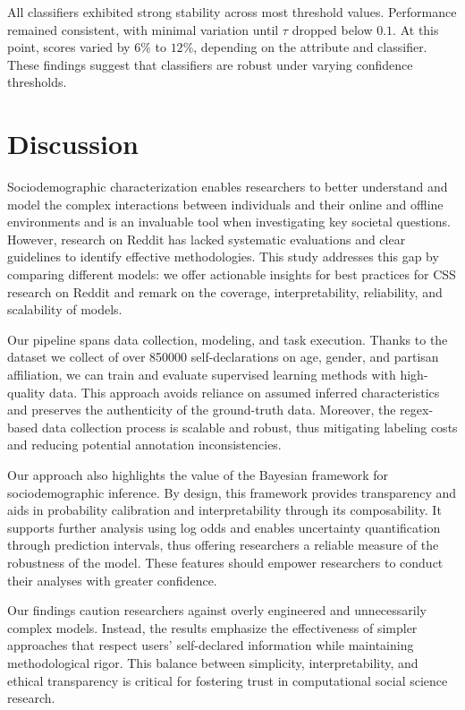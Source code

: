 All classifiers exhibited strong stability across most threshold values.
Performance remained consistent, with minimal variation until $\tau$ dropped below $0.1$.
At this point, scores varied by $6\%$ to $12\%$, depending on the attribute and classifier.
These findings suggest that classifiers are robust under varying confidence thresholds.



\section{Discussion}

Sociodemographic characterization enables researchers to better understand and model the complex interactions between individuals and their online and offline environments and is an invaluable tool when investigating key societal questions.
However, research on Reddit has lacked systematic evaluations and clear guidelines to identify effective methodologies.
This study addresses this gap by comparing different models:
we offer actionable insights for best practices for CSS research on Reddit and remark on the coverage, interpretability, reliability, and scalability of models.

Our pipeline
spans data collection, modeling, and task execution. %
Thanks to the dataset we collect of over \num{850000} self-declarations on age, gender, and partisan affiliation, we can train and evaluate supervised learning methods with high-quality data.
This approach avoids reliance on assumed inferred characteristics and preserves the authenticity of the ground-truth data.
Moreover, the regex-based data collection process is scalable and robust, thus mitigating labeling costs and reducing potential annotation inconsistencies.


Our approach also highlights the value of the Bayesian framework for sociodemographic inference.
By design, this framework provides transparency and aids in probability calibration and interpretability through its composability.
It supports further analysis using log odds and enables uncertainty quantification through prediction intervals, thus offering researchers a reliable measure of the robustness of the model.
These features should empower researchers to conduct their analyses with greater confidence.

Our findings caution researchers against overly engineered and unnecessarily complex models.
Instead, the results emphasize the effectiveness of simpler approaches that respect users’ self-declared information while maintaining methodological rigor.
This balance between simplicity, interpretability, and ethical transparency is critical for fostering trust in computational social science research.

